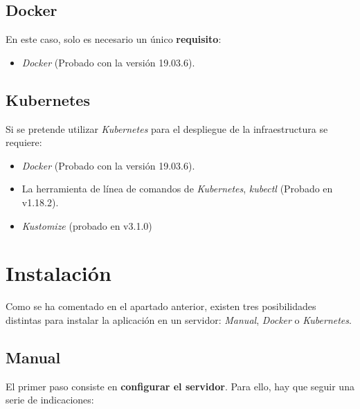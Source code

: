 \subsection{Docker}

En este caso, solo es necesario un único \textbf{requisito}:

\begin{itemize}
\tightlist
\item
  \emph{Docker} \cite{docker:install} (Probado con la versión 19.03.6).
\end{itemize}

\subsection{Kubernetes}

Si se pretende utilizar \emph{Kubernetes} para el despliegue de la
infraestructura se requiere:

\begin{itemize}
\tightlist
\item
  \emph{Docker}  \cite{docker:install} (Probado con la versión 19.03.6).
\item
  La herramienta de línea de comandos de \emph{Kubernetes},
  \emph{kubectl} \cite{kubectl:install} (Probado en v1.18.2).
\item
  \emph{Kustomize} \cite{kustomize:repo} (probado en v3.1.0)
\end{itemize}

\section{Instalación}

Como se ha comentado en el apartado anterior, existen tres posibilidades
distintas para instalar la aplicación en un servidor: \emph{Manual},
\emph{Docker} o \emph{Kubernetes}.

\subsection{Manual}
El primer paso consiste en \textbf{configurar el servidor}. Para ello,
hay que seguir una serie de indicaciones:

